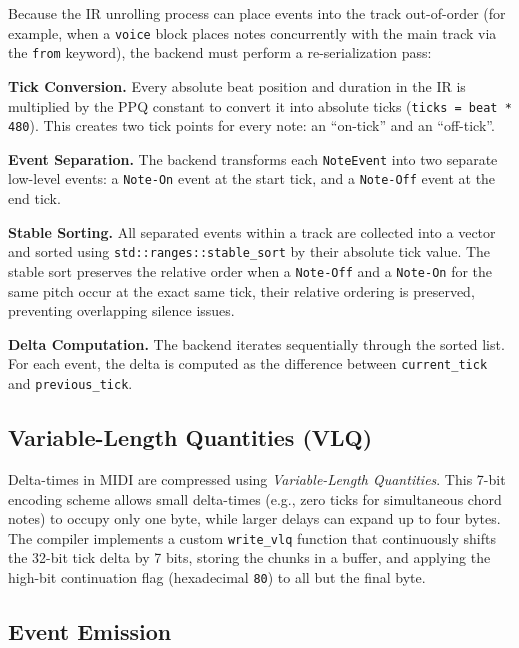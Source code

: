Because the IR unrolling process can place events into the track out-of-order (for example, when a \texttt{voice} block
places notes concurrently with the main track via the \texttt{from} keyword), the backend must perform a
re-serialization pass:

\noindent \textbf{Tick Conversion.} Every absolute beat position and duration in the IR is multiplied by the
PPQ constant
to convert it into absolute ticks (\texttt{ticks = beat * 480}).
This creates two tick points for every note: an ``on-tick'' and an ``off-tick''.

\noindent \textbf{Event Separation.} The backend transforms each \texttt{NoteEvent} into two separate
low-level events: a
\texttt{Note-On} event at the start tick, and a \texttt{Note-Off} event at the end tick.

\noindent \textbf{Stable Sorting.} All separated events within a track are collected into a vector and sorted using
\texttt{std::ranges::stable\_sort} by their absolute tick value.
The stable sort preserves the relative order when a \texttt{Note-Off} and a \texttt{Note-On} for the same
pitch occur at the exact
same tick, their relative ordering is preserved, preventing overlapping silence issues.

\noindent \textbf{Delta Computation.} The backend iterates sequentially through the sorted list.
For each event, the delta is computed as the difference between \texttt{current\_tick} and
\texttt{previous\_tick}.

\subsection{Variable-Length Quantities (VLQ)}\label{detail-subsec:variable-length-quantities-(vlq)}

Delta-times in MIDI are compressed using \textit{Variable-Length Quantities}.
This 7-bit encoding scheme allows small delta-times (e.g., zero ticks for simultaneous chord notes) to occupy only one
byte, while larger delays can expand up to four bytes.
The compiler implements a custom \texttt{write\_vlq} function that continuously shifts the 32-bit tick delta by 7 bits,
storing the chunks in a buffer, and applying the high-bit continuation flag (hexadecimal \texttt{80}) to all but the
final byte.

\subsection{Event Emission}\label{detail-subsec:event-emission}


